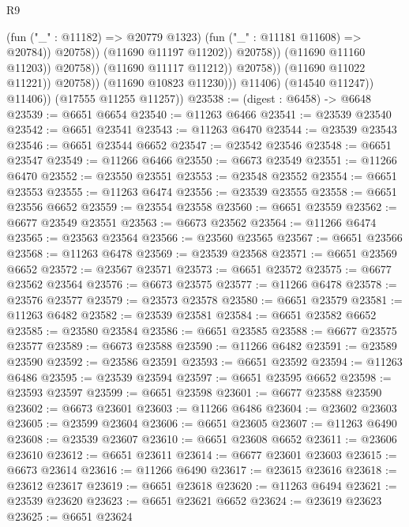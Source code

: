 \begin{lexlean}{R9}
\begin{coremodule}
{{{{{{{{{{{{{{{{{{{{{{{{{{{{{{{{{{{{{{{{{{{{{{{{{{{{{{{{{{{{{{{{{{{{{{{{{{{{{{{{{{{{                                                (fun ("_" : @11182) => @20779 @1323)
                                                (fun ("_" : @11181 @11608) => @20784))
                                              @20758))
                                          (@11690 @11197 @11202))
                                        @20758))
                                    (@11690 @11160 @11203))
                                  @20758))
                              (@11690 @11117 @11212))
                            @20758))
                        (@11690 @11022 @11221))
                      @20758))
                  (@11690 @10823 @11230)))
              @11406)
            (@14540 @11247))
          @11406))
      (@17555 @11255 @11257))
@23538 := (digest : @6458) -> @6648
@23539 := @6651 @6654
@23540 := @11263 @6466
@23541 := @23539 @23540
@23542 := @6651 @23541
@23543 := @11263 @6470
@23544 := @23539 @23543
@23546 := @6651 @23544 @6652
@23547 := @23542 @23546
@23548 := @6651 @23547
@23549 := @11266 @6466
@23550 := @6673 @23549
@23551 := @11266 @6470
@23552 := @23550 @23551
@23553 := @23548 @23552
@23554 := @6651 @23553
@23555 := @11263 @6474
@23556 := @23539 @23555
@23558 := @6651 @23556 @6652
@23559 := @23554 @23558
@23560 := @6651 @23559
@23562 := @6677 @23549 @23551
@23563 := @6673 @23562
@23564 := @11266 @6474
@23565 := @23563 @23564
@23566 := @23560 @23565
@23567 := @6651 @23566
@23568 := @11263 @6478
@23569 := @23539 @23568
@23571 := @6651 @23569 @6652
@23572 := @23567 @23571
@23573 := @6651 @23572
@23575 := @6677 @23562 @23564
@23576 := @6673 @23575
@23577 := @11266 @6478
@23578 := @23576 @23577
@23579 := @23573 @23578
@23580 := @6651 @23579
@23581 := @11263 @6482
@23582 := @23539 @23581
@23584 := @6651 @23582 @6652
@23585 := @23580 @23584
@23586 := @6651 @23585
@23588 := @6677 @23575 @23577
@23589 := @6673 @23588
@23590 := @11266 @6482
@23591 := @23589 @23590
@23592 := @23586 @23591
@23593 := @6651 @23592
@23594 := @11263 @6486
@23595 := @23539 @23594
@23597 := @6651 @23595 @6652
@23598 := @23593 @23597
@23599 := @6651 @23598
@23601 := @6677 @23588 @23590
@23602 := @6673 @23601
@23603 := @11266 @6486
@23604 := @23602 @23603
@23605 := @23599 @23604
@23606 := @6651 @23605
@23607 := @11263 @6490
@23608 := @23539 @23607
@23610 := @6651 @23608 @6652
@23611 := @23606 @23610
@23612 := @6651 @23611
@23614 := @6677 @23601 @23603
@23615 := @6673 @23614
@23616 := @11266 @6490
@23617 := @23615 @23616
@23618 := @23612 @23617
@23619 := @6651 @23618
@23620 := @11263 @6494
@23621 := @23539 @23620
@23623 := @6651 @23621 @6652
@23624 := @23619 @23623
@23625 := @6651 @23624
}}}}}}}}}}}}}}}}}}}}}}}}}}}}}}}}}}}}}}}}}}}}}}}}}}}}}}}}}}}}}}}}}}}}}}}}}}}}}}}}}}}}
\end{coremodule}
\end{lexlean}
